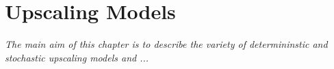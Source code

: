 
\chapter{Upscaling Models}\label{Chapter:UpscalingModels}

\begin{adjustwidth}{1cm}{1cm}
   {\it The main aim of this chapter is to describe the variety of determininstic and stochastic upscaling models and ...}
\medskip
\end{adjustwidth}
